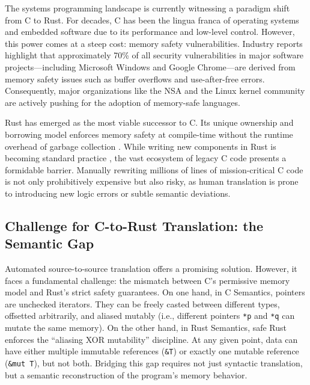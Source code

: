 \documentclass{llncs} %
\begin{document}
The systems programming landscape is currently witnessing a paradigm shift from C to Rust. For decades, C has been the lingua franca of operating systems and embedded software due to its performance and low-level control. However, this power comes at a steep cost: memory safety vulnerabilities. Industry reports highlight that approximately 70\% of all security vulnerabilities in major software projects—including Microsoft Windows \cite{Microsoft2019} and Google Chrome—are derived from memory safety issues such as buffer overflows and use-after-free errors. Consequently, major organizations like the NSA \cite{NSA2022} and the Linux kernel community are actively pushing for the adoption of memory-safe languages.

Rust has emerged as the most viable successor to C. Its unique ownership and borrowing model enforces memory safety at compile-time without the runtime overhead of garbage collection \cite{Jung2017}. While writing new components in Rust is becoming standard practice \cite{VanderStoep2021}, the vast ecosystem of legacy C code presents a formidable barrier. Manually rewriting millions of lines of mission-critical C code is not only prohibitively expensive but also risky, as human translation is prone to introducing new logic errors or subtle semantic deviations.

\subsection{Challenge for C-to-Rust Translation: the Semantic Gap}
Automated source-to-source translation offers a promising solution. However, it faces a fundamental challenge: the mismatch between C's permissive memory model and Rust's strict safety guarantees.
%
On one hand, in C Semantics, pointers are unchecked iterators. They can be freely casted between different types, offsetted arbitrarily, and aliased mutably (i.e., different pointers \texttt{*p} and \texttt{*q} can mutate the same memory).
%
On the other hand, in Rust Semantics, safe Rust enforces the ``aliasing XOR mutability'' discipline. At any given point, data can have either multiple immutable references (\texttt{\&T}) or exactly one mutable reference (\texttt{\&mut T}), but not both.
%
Bridging this gap requires not just syntactic translation, but a semantic reconstruction of the program's memory behavior.
\end{document}
